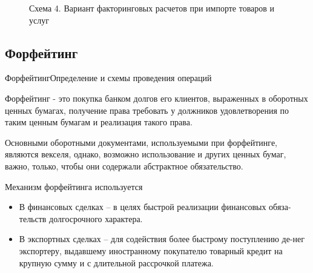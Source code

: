 \documentclass[_Banking_p3.tex]{subfiles}
\begin{document}
\begin{frame}[shrink=15]
\begin{figure}
\center
\begin{overprint}
\end{overprint}
\vspace*{-2em}
\caption{Схема 4. Вариант факторинговых расчетов при импорте товаров и услуг}
\end{figure}







\end{frame}



\subsection{Форфейтинг}
\begin{frame}{Форфейтинг}{Определение и схемы проведения операций}

\begin{block}{Форфейтинг }
\quad
- это покупка банком долгов его клиентов, выраженных в оборотных ценных бумагах, получение права требовать у должников удовлетворения по таким ценным бумагам и реализация такого права.
\end{block}

Основными оборотными документами, используемыми при форфейтинге, являются векселя, однако, возможно использование и других ценных бумаг, важно, только, чтобы они содержали абстрактное обязательство.
\end{frame}

\begin{frame}{Механизм форфейтинга используется}
\begin{itemize}[<+->]
\item
В финансовых сделках – в целях быстрой реализации финансовых обяза-тельств долгосрочного характера.

\item
В экспортных сделках – для содействия более быстрому поступлению де-нег экспортеру, выдавшему иностранному покупателю товарный кредит на крупную сумму и с длительной рассрочкой платежа.
\end{itemize}
\end{frame}
\end{document}
